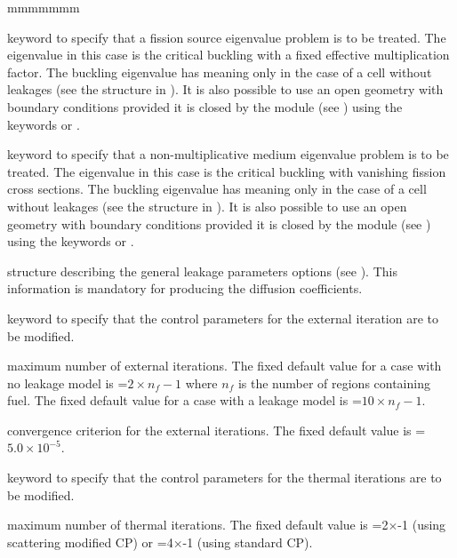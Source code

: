 \begin{ListeDeDescription}{mmmmmmm}
\item[\moc{B}] keyword to specify that a fission source eigenvalue problem is
to be treated. The eigenvalue in this case is the critical buckling with a fixed
effective multiplication factor. The buckling eigenvalue has meaning only in the
case of a cell without leakages (see the structure  in
). It is also possible to use an open geometry with
 boundary conditions  provided it is closed by the  module
(see ) using the keywords  or .

\item[\moc{L}] keyword to specify that a non-multiplicative medium eigenvalue
problem is to be treated. The eigenvalue in this case is the critical buckling
with vanishing fission cross sections. The buckling eigenvalue has meaning only in the
case of a cell without leakages (see the structure  in
). It is also possible to use an open geometry with
 boundary conditions  provided it is closed by the  module
(see ) using the keywords  or .

\item[\dstr{descleak}] structure describing the general leakage parameters
options (see ). This information is mandatory for producing the
diffusion coefficients.

\item[\moc{EXTE}] keyword to specify that the control parameters for the
external iteration are to be modified. 

\item[\dusa{maxout}] maximum number of external iterations. The fixed default
value for a case with no leakage model is =$2\times n_{f}-1$ where
$n_{f}$ is the number of regions containing fuel. The fixed default value for a
case with a leakage model is =$10\times n_{f}-1$.

\item[\dusa{epsout}] convergence criterion for the external iterations. The
fixed default value is =$5.0\times 10^{-5}$.

\item[\moc{THER}] keyword to specify that the control parameters for the
thermal iterations are to be modified.

\item[\dusa{maxthr}] maximum number of thermal iterations. The fixed default
value is =2$\times$-1 (using scattering modified CP)
or =4$\times$-1 (using standard CP).


\end{ListeDeDescription}
